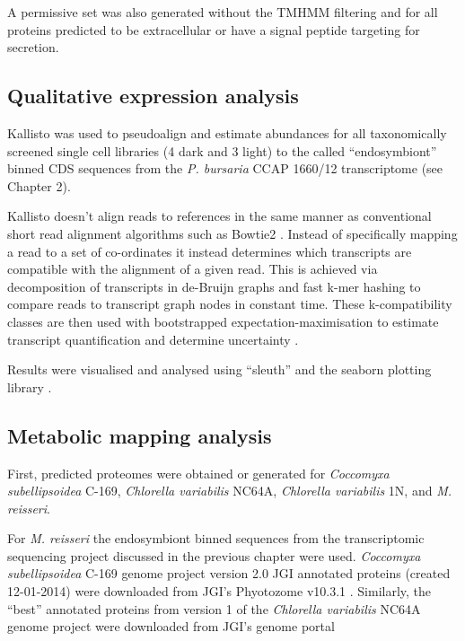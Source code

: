A permissive set was also generated without the TMHMM filtering 
and for all proteins predicted to be extracellular or have a signal
peptide targeting for secretion.

\subsection{Qualitative expression analysis}

Kallisto \citep{Bray2015} was used to pseudoalign and estimate abundances for 
all taxonomically screened single cell 
libraries (4 dark and 3 light) to the called ``endosymbiont''
binned CDS sequences from the \textit{P. bursaria} CCAP 1660/12
transcriptome (see Chapter 2).

Kallisto doesn't align reads to references in the same
manner as conventional short read alignment algorithms
such as Bowtie2 \citep{Langmead2012}.  Instead of specifically 
mapping a read to a set of co-ordinates it instead
determines which transcripts are compatible with the alignment 
of a given read.  This is achieved via decomposition of transcripts
in de-Bruijn graphs and fast k-mer hashing to compare reads to transcript
graph nodes in constant time.  These k-compatibility classes are then used with
bootstrapped expectation-maximisation to estimate transcript quantification and
determine uncertainty \citep{Bray2015}. 

Results were visualised and analysed using ``sleuth'' and the
seaborn plotting library \citep{michael_waskom_2015_19108}.

\subsection{Metabolic mapping analysis}

First, predicted proteomes were obtained or generated for
\textit{Coccomyxa subellipsoidea} C-169, \textit{Chlorella variabilis}
NC64A, \textit{Chlorella variabilis} 1N, and \textit{M. reisseri}. 

For \textit{M. reisseri} the endosymbiont binned sequences from the transcriptomic
sequencing project discussed in the previous chapter were used. 
\textit{Coccomyxa subellipsoidea} C-169 genome project \citep{Blanc2012} version 2.0 
JGI annotated proteins (created 12-01-2014) were downloaded from JGI's
Phyotozome v10.3.1 \citep{Goodstein2012}. 
Similarly, the ``best'' annotated proteins from
version 1 of the \textit{Chlorella variabilis} NC64A genome project \citep{Blanc2010}
were downloaded from JGI's genome portal \citep{Grigoriev2011,Nordberg2014}

